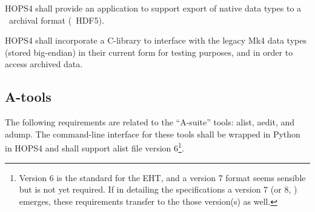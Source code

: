 \begin{description}
 HOPS4 shall provide an application to support export of native
data types to a \TBD~archival format (\eg~HDF5).

 HOPS4 shall incorporate a C-library to interface with the legacy
\acs{Mk4} data types (stored \acs{big-endian}) in their current form for
testing purposes, and in order to access archived data.

\end{description}




\subsection{A-tools}
\label{sec:areq}

The following requirements are related to the ``A-suite'' tools: \acs{alist}, \acs{aedit},
and \acs{adump}.  The command-line interface for these tools shall be wrapped
in Python in HOPS4 and shall support alist file version 6\footnote{Version 6 is the standard for the \ac{EHT}, and a version 7 format seems
sensible but is not yet required.  If in detailing the specifications
a version 7 (or 8, \etc) emerges, these requirements transfer
to the those version(s) as well.}.




